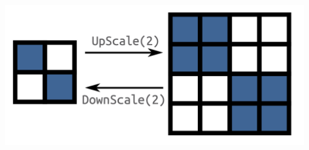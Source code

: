 \documentclass[12pt]{article}
\begin{document}
\begin{center}
  \includegraphics[width=0.5\linewidth]{scaling.png}
\end{center}
\end{document}

